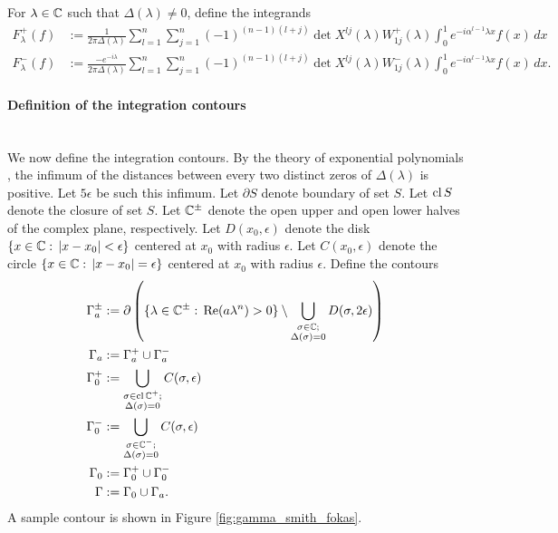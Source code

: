 \documentclass[12pt, oneside, a4paper]{article}
\begin{document}
For $\lambda\in\mathbb C$ such that $\Delta(\lambda)\neq 0$, define the integrands
\begin{subequations}\label{eq:F_lambda_+-}
    \begin{align}
        F^+_\lambda(f) &:= \frac{1}{2\pi \Delta(\lambda)} \sum_{l=1}^n\sum_{j=1}^n(-1)^{(n-1)(l+j)}\det X^{lj}(\lambda)W^+_{1j}(\lambda)\int_0^1 e^{-i\alpha^{l-1}\lambda x}f(x)\,dx \label{eq:F+}\\
        F^-_\lambda(f) &:= \frac{-e^{-i\lambda}}{2\pi \Delta(\lambda)} \sum_{l=1}^n\sum_{j=1}^n(-1)^{(n-1)(l+j)}\det X^{lj}(\lambda)W^-_{1j}(\lambda)\int_0^1 e^{-i\alpha^{l-1}\lambda x}f(x)\,dx. \label{eq:F-}
    \end{align}
\end{subequations}

\paragraph{Definition of the integration contours}\label{sec:contour_defn}\mbox{}\\
We now define the integration contours. By the theory of exponential polynomials \cite{Langer1931}, the infimum of the distances between every two distinct zeros of $\Delta(\lambda)$ is positive. Let $5\epsilon$ be such this infimum. Let $\partial S$ denote boundary of set $S$. Let $\operatorname{cl}{S}$ denote the closure of set $S$. Let $\mathbb C^\pm$ denote the open upper and open lower halves of the complex plane, respectively. Let $D(x_0,\epsilon)$ denote the disk $\{x\in\mathbb C:\, |x-x_0|<\epsilon\}$ centered at $x_0$ with radius $\epsilon$. Let $C(x_0,\epsilon)$ denote the circle $\{x\in\mathbb C:\, |x-x_0|=\epsilon\}$ centered at $x_0$ with radius $\epsilon$. Define the contours
\begin{subequations}\label{eq:gamma}
    \begin{align}
        \Gamma_a^{\pm} &:= \partial\left(\{\lambda\in\mathbb C^{\pm}:\, \mathrm{Re}(a\lambda^n)>0\}\setminus \bigcup_{\substack{\sigma\in\mathbb C;\\\Delta(\sigma)=0}} D(\sigma, 2\epsilon)\right)\label{eq:gammaAPlusMinus}\\
        \Gamma_a &:= \Gamma_a^+\cup \Gamma_a^-\\
        \Gamma_0^+ &:= \bigcup_{\substack{\sigma\in\operatorname{cl}\mathbb C^+;\\ \Delta(\sigma)=0}} C(\sigma, \epsilon)\label{eq:gamma0Plus}\\
        \Gamma_0^- &:= \bigcup_{\substack{\sigma\in\mathbb C^-;\\ \Delta(\sigma)=0}} C(\sigma, \epsilon)\label{eq:gamma0Minus}\\
        \Gamma_0 &:= \Gamma_0^+\cup \Gamma_0^-\\
        \Gamma &:= \Gamma_0\cup \Gamma_a.
    \end{align}
\end{subequations}
A sample contour is shown in Figure \ref{fig:gamma_smith_fokas}.
\end{document}
